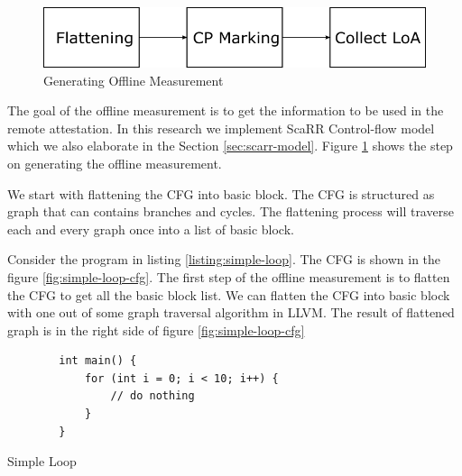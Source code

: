 \begin{figure}[htbp]
\centerline{\includegraphics[scale=.75]{Figures/04/scarr-overview.png}}
\caption{Generating Offline Measurement}
\label{fig:scarr-overview}
\end{figure}

The goal of the offline measurement is to get the information to be used in the
remote attestation. In this research we implement ScaRR Control-flow model
\cite{toffaliniScaRRScalableRuntime2019} which we also elaborate in the Section
\ref{sec:scarr-model}. Figure \ref{fig:scarr-overview} shows the step on
generating the offline measurement.

We start with flattening the CFG into basic block. The CFG is structured as
graph that can contains branches and cycles. The flattening process will
traverse each and every graph once into a list of basic block. 

Consider the program in listing \ref{listing:simple-loop}. The CFG is shown in
the figure \ref{fig:simple-loop-cfg}. The first step of the offline measurement
is to flatten the CFG to get all the basic block list. We can flatten the CFG
into basic block with one out of some graph traversal algorithm in LLVM. The
result of flattened graph is in the right side of figure
\ref{fig:simple-loop-cfg}

\begin{listing}[htbp]
    \begin{verbatim}
        int main() {
            for (int i = 0; i < 10; i++) {
                // do nothing
            }
        }
    \end{verbatim}
    \caption{Simple Loop}    
    \label{listing:simple-loop}
\end{listing}

